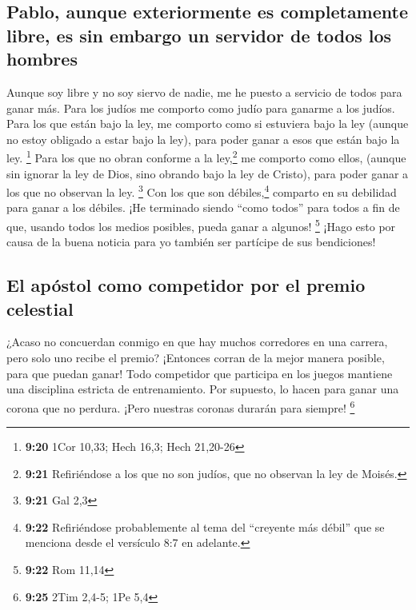 \hypertarget{pablo-aunque-exteriormente-es-completamente-libre-es-sin-embargo-un-servidor-de-todos-los-hombres}{%
\subsection{Pablo, aunque exteriormente es completamente libre, es sin
embargo un servidor de todos los
hombres}\label{pablo-aunque-exteriormente-es-completamente-libre-es-sin-embargo-un-servidor-de-todos-los-hombres}}

 Aunque soy libre y no soy siervo de nadie, me he puesto
a servicio de todos para ganar más.  Para los judíos me
comporto como judío para ganarme a los judíos. Para los que están bajo
la ley, me comporto como si estuviera bajo la ley (aunque no estoy
obligado a estar bajo la ley), para poder ganar a esos que están bajo la
ley. \footnote{\textbf{9:20} 1Cor 10,33; Hech 16,3; Hech 21,20-26}
 Para los que no obran conforme a la ley,\footnote{\textbf{9:21}
  Refiriéndose a los que no son judíos, que no observan la ley de
  Moisés.} me comporto como ellos, (aunque sin ignorar la ley de Dios,
sino obrando bajo la ley de Cristo), para poder ganar a los que no
observan la ley. \footnote{\textbf{9:21} Gal 2,3}  Con
los que son débiles,\footnote{\textbf{9:22} Refiriéndose probablemente
  al tema del ``creyente más débil'' que se menciona desde el versículo
  8:7 en adelante.} comparto en su debilidad para ganar a los débiles.
¡He terminado siendo ``como todos'' para todos a fin de que, usando
todos los medios posibles, pueda ganar a algunos! \footnote{\textbf{9:22}
  Rom 11,14}  ¡Hago esto por causa de la buena noticia
para yo también ser partícipe de sus bendiciones!

\hypertarget{el-apuxf3stol-como-competidor-por-el-premio-celestial}{%
\subsection{El apóstol como competidor por el premio
celestial}\label{el-apuxf3stol-como-competidor-por-el-premio-celestial}}

 ¿Acaso no concuerdan conmigo en que hay muchos
corredores en una carrera, pero solo uno recibe el premio? ¡Entonces
corran de la mejor manera posible, para que puedan ganar!
 Todo competidor que participa en los juegos mantiene una
disciplina estricta de entrenamiento. Por supuesto, lo hacen para ganar
una corona que no perdura. ¡Pero nuestras coronas durarán para siempre!
\footnote{\textbf{9:25} 2Tim 2,4-5; 1Pe 5,4}

